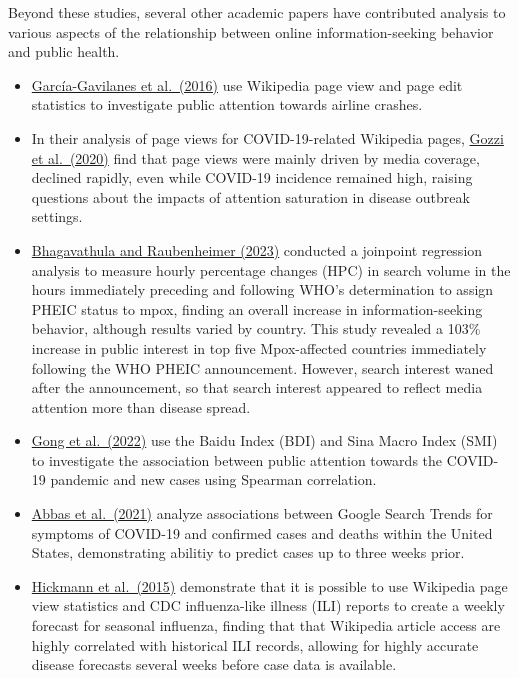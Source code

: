 \documentclass[
  12pt,
]{article}
\begin{document}
Beyond these studies, several other academic papers have contributed
analysis to various aspects of the relationship between online
information-seeking behavior and public health.

\begin{itemize}
\item
  \href{https://doi.org/10.1098/rsos.160460}{García-Gavilanes et
  al.~(2016)} use Wikipedia page view and page edit statistics to
  investigate public attention towards airline crashes.
\item
  In their analysis of page views for COVID-19-related Wikipedia pages,
  \href{https://doi.org/10.2196/21597}{Gozzi et al.~(2020)} find that
  page views were mainly driven by media coverage, declined rapidly,
  even while COVID-19 incidence remained high, raising questions about
  the impacts of attention saturation in disease outbreak settings.
\item
  \href{https://doi.org/10.3390/info14010005}{Bhagavathula and
  Raubenheimer (2023)} conducted a joinpoint regression analysis to
  measure hourly percentage changes (HPC) in search volume in the hours
  immediately preceding and following WHO's determination to assign
  PHEIC status to mpox, finding an overall increase in
  information-seeking behavior, although results varied by country. This
  study revealed a 103\% increase in public interest in top five
  Mpox-affected countries immediately following the WHO PHEIC
  announcement. However, search interest waned after the announcement,
  so that search interest appeared to reflect media attention more than
  disease spread.
\item
  \href{https://doi.org/10.3389/fpubh.2021.755530}{Gong et al.~(2022)}
  use the Baidu Index (BDI) and Sina Macro Index (SMI) to investigate
  the association between public attention towards the COVID-19 pandemic
  and new cases using Spearman correlation.
\item
  \href{https://doi.org/10.3390/ijerph18094560}{Abbas et al.~(2021)}
  analyze associations between Google Search Trends for symptoms of
  COVID-19 and confirmed cases and deaths within the United States,
  demonstrating abilitiy to predict cases up to three weeks prior.
\item
  \href{https://doi.org/10.1371/journal.pcbi.1004239}{Hickmann et
  al.~(2015)} demonstrate that it is possible to use Wikipedia page view
  statistics and CDC influenza-like illness (ILI) reports to create a
  weekly forecast for seasonal influenza, finding that that Wikipedia
  article access are highly correlated with historical ILI records,
  allowing for highly accurate disease forecasts several weeks before
  case data is available.
\end{itemize}
\end{document}
